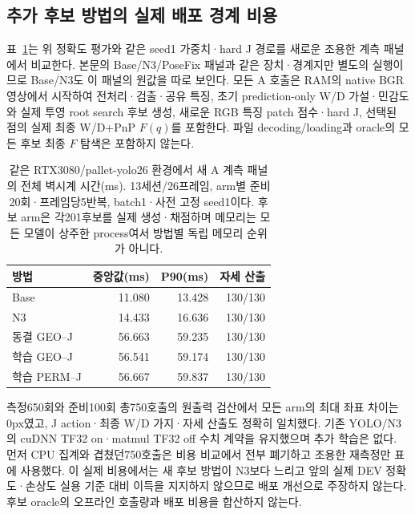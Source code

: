 \subsection{추가 후보 방법의 실제 배포 경계 비용}

표~\ref{sup:joint_action_runtime}는 위 정확도 평가와 같은 seed1 가중치·hard J 경로를 새로운 조용한 계측 패널에서 비교한다. 본문의 Base/N3/PoseFix 패널과 같은 장치·경계지만 별도의 실행이므로 Base/N3도 이 패널의 원값을 따로 보인다. 모든 A 호출은 RAM의 native BGR 영상에서 시작하여 전처리·검출·공유 특징, 초기 prediction-only W/D 가설·민감도와 실제 투영 root search 후보 생성, 새로운 RGB 특징 patch 점수·hard J, 선택된 점의 실제 최종 W/D+PnP $F(q)$를 포함한다. 파일 decoding/loading과 oracle의 모든 후보 최종 $F$ 탐색은 포함하지 않는다.

\begin{table}[t]\centering\small\caption{같은 RTX3080/pallet-yolo26 환경에서 새 A 계측 패널의 전체 벽시계 시간(ms). 13세션/26프레임, arm별 준비20회·프레임당5반복, batch1·사전 고정 seed1이다. 후보 arm은 각201후보를 실제 생성·채점하며 메모리는 모든 모델이 상주한 process여서 방법별 독립 메모리 순위가 아니다.}\label{sup:joint_action_runtime}\begin{tabular}{lrrr}\toprule 방법 & 중앙값(ms) & P90(ms) & 자세 산출 \\\midrule

Base & 11.080 & 13.428 & 130/130\\

N3 & 14.433 & 16.636 & 130/130\\

동결 GEO--J & 56.663 & 59.235 & 130/130\\

학습 GEO--J & 56.541 & 59.174 & 130/130\\

학습 PERM--J & 56.667 & 59.837 & 130/130\\

\bottomrule\end{tabular}\end{table}

측정650회와 준비100회 총750호출의 원출력 검산에서 모든 arm의 최대 좌표 차이는 0px였고, J action·최종 W/D 가지·자세 산출도 정확히 일치했다. 기존 YOLO/N3의 cuDNN TF32 on·matmul TF32 off 수치 계약을 유지했으며 추가 학습은 없다. 먼저 CPU 집계와 겹쳤던750호출은 비용 비교에서 전부 폐기하고 조용한 재측정만 표에 사용했다. 이 실제 비용에서는 새 후보 방법이 N3보다 느리고 앞의 실제 DEV 정확도·손상도 실용 기준 대비 이득을 지지하지 않으므로 배포 개선으로 주장하지 않는다. 후보 oracle의 오프라인 호출량과 배포 비용을 합산하지 않는다.
